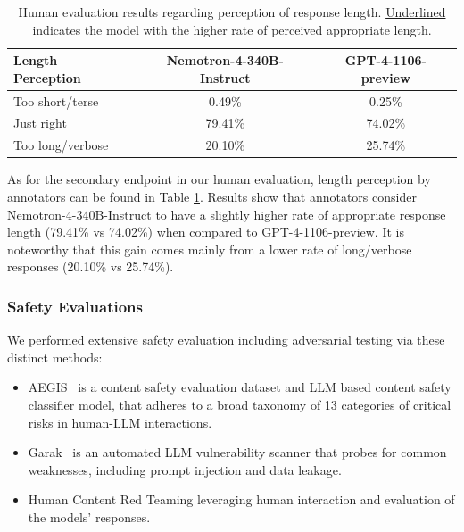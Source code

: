 \documentclass[11pt]{article}
\newcommand{\oursin}{Nemotron-4-340B-Instruct}
\begin{document}
\begin{table}[ht!]
\centering

\begin{tabular}{lcc}
\toprule                                  
\textbf{Length Perception} & \textbf{\oursin{}} & \textbf{GPT-4-1106-preview} \\
\midrule
Too short/terse       & 0.49\%                  & 0.25\%  \\
Just right            & \underline{79.41\%}     & 74.02\%  \\
Too long/verbose      & 20.10\%                 & 25.74\%  \\
\bottomrule
\end{tabular}
\caption{Human evaluation results regarding perception of response length. \underline{Underlined} indicates the model with the higher rate of perceived appropriate length.}
\label{tab:human-eval-length}
\end{table}

As for the secondary endpoint in our human evaluation, length perception by annotators can be found in Table \ref{tab:human-eval-length}. Results show that annotators consider \oursin{} to have a slightly higher rate of appropriate response length (79.41\% vs 74.02\%) when compared to GPT-4-1106-preview. It is noteworthy that this gain comes mainly from a lower rate of long/verbose responses (20.10\% vs 25.74\%).




\subsubsection{Safety Evaluations}

We performed extensive safety evaluation including adversarial testing via these distinct methods: 
\begin{itemize}
    \item AEGIS~\citep{ghosh2024aegis} is a content safety evaluation dataset and LLM based content safety classifier model, that adheres to a broad taxonomy of 13 categories of critical risks in human-LLM interactions.
    \item Garak~\citep{garak} is an automated LLM vulnerability scanner that probes for common weaknesses, including prompt injection and data leakage. 
    \item Human Content Red Teaming leveraging human interaction and evaluation of the models' responses.
\end{itemize}
\end{document}
